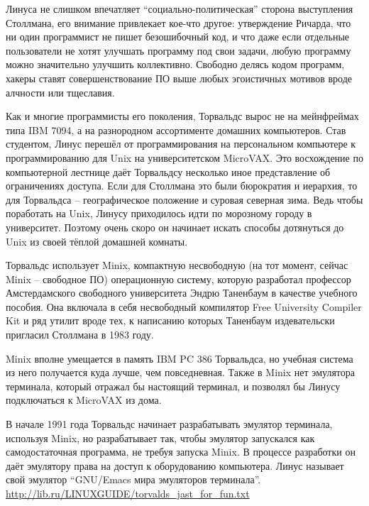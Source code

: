 Линуса не слишком впечатляет ``социально-политическая'' сторона выступления Столлмана, его внимание привлекает кое-что другое: утверждение Ричарда, что ни один программист не пишет безошибочный код, и что даже если отдельные пользователи не хотят улучшать программу под свои задачи, любую программу можно значительно улучшить коллективно. Свободно делясь кодом программ, хакеры ставят совершенствование ПО выше любых эгоистичных мотивов вроде алчности или тщеславия.

Как и многие программисты его поколения, Торвальдс вырос не на мейнфреймах типа IBM 7094, а на разнородном ассортименте домашних компьютеров. Став студентом, Линус перешёл от программирования на персональном компьютере к программированию для Unix на университетском MicroVAX. Это восхождение по компьютерной лестнице даёт Торвальдсу несколько иное представление об ограничениях доступа. Если для Столлмана это были бюрократия и иерархия, то для Торвальдса -- географическое положение и суровая северная зима. Ведь чтобы поработать на Unix, Линусу приходилось идти по морозному городу в университет. Поэтому очень скоро он начинает искать способы дотянуться до Unix из своей тёплой домашней комнаты.

Торвальдс использует Minix, компактную несвободную (на тот момент, сейчас Minix -- свободное ПО) операционную систему, которую разработал профессор Амстердамского свободного университета Эндрю Таненбаум в качестве учебного пособия. Она включала в себя несвободный компилятор Free University Compiler Kit и ряд утилит вроде тех, к написанию которых Таненбаум издевательски пригласил Столлмана в 1983 году. 

Minix вполне умещается в память IBM PC 386 Торвальдса, но учебная система из него получается куда лучше, чем повседневная. Также в Minix нет эмулятора терминала, который отражал бы настоящий терминал, и позволял бы Линусу подключаться к MicroVAX из дома.

В начале 1991 года Торвальдс начинает разрабатывать эмулятор терминала, используя Minix, но разрабатывает так, чтобы эмулятор запускался как самодостаточная программа, не требуя запуска Minix. В процессе разработки он даёт эмулятору права на доступ к оборудованию компьютера. Линус называет свой эмулятор ``GNU/Emacs мира эмуляторов терминала''.  \url{http://lib.ru/LINUXGUIDE/torvalds_jast_for_fun.txt}

